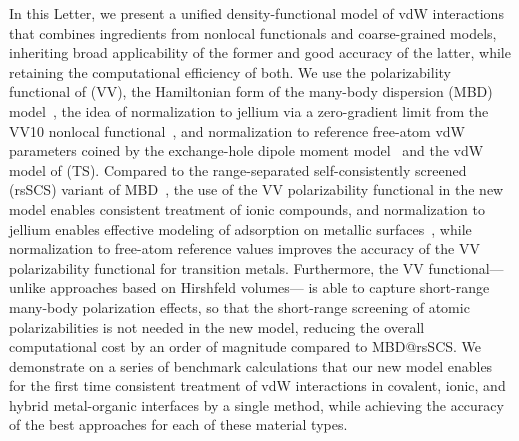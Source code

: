 In this Letter, we present a unified density-functional model of vdW interactions that combines ingredients from nonlocal functionals and coarse-grained models, inheriting broad applicability of the former and good accuracy of the latter, while retaining the computational efficiency of both.
We use the polarizability functional of \citet{VydrovPRA10} (VV), the Hamiltonian form of the many-body dispersion (MBD) model~\citep{TkatchenkoJCP13}, the idea of normalization to jellium via a zero-gradient limit from the VV10 nonlocal functional~\citep{VydrovJCP10a}, and normalization to reference free-atom vdW parameters coined by the exchange-hole dipole moment model~\citep{BeckeJCP06} and the vdW model of \citet{TkatchenkoPRL09} (TS).
Compared to the range-separated self-consistently screened (rsSCS) variant of MBD~\citep{AmbrosettiJCP14}, the use of the VV polarizability functional in the new model enables consistent treatment of ionic compounds, and normalization to jellium enables effective modeling of adsorption on metallic surfaces~\citep{RuizPRL12}, while normalization to free-atom reference values improves the accuracy of the VV polarizability functional for transition metals.
Furthermore, the VV functional---unlike approaches based on Hirshfeld volumes---
is able to capture short-range many-body polarization effects, so that the short-range screening of atomic polarizabilities is not needed in the new model, reducing the overall computational cost by an order of magnitude compared to MBD@rsSCS\@.
We demonstrate on a series of benchmark calculations that our new model enables for the first time consistent treatment of vdW interactions in covalent, ionic, and hybrid metal-organic interfaces by a single method, while achieving the accuracy of the best approaches for each of these material types.

